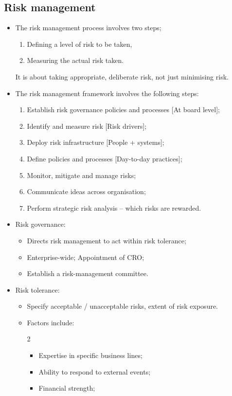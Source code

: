 \documentclass[../notes_compiled.tex]{subfiles}
\begin{document}
\subsection{Risk management}
\begin{itemize}
\item The risk management process involves two steps;
\begin{enumerate}
\item Defining a level of risk to be taken,
\item Measuring the actual risk taken.
\end{enumerate}
It is about taking appropriate, deliberate risk, not just minimising risk.
\item The risk management framework involves the following steps:
\begin{enumerate}
\item Establish risk governance policies and processes [At board level];
\item Identify and measure risk [Risk drivers];
\item Deploy risk infrastructure [People + systems];
\item Define policies and processes [Day-to-day practices];
\item Monitor, mitigate and manage risks;
\item Communicate ideas across organisation;
\item Perform strategic risk analysis -- which risks are rewarded.
\end{enumerate}
\item Risk governance:
\begin{itemize}
\item Directs risk management to act within risk tolerance;
\item Enterprise-wide; Appointment of CRO;
\item Establish a risk-management committee.
\end{itemize}
\item Risk tolerance:
\begin{itemize}
\item Specify acceptable / unacceptable risks, extent of risk exposure.
\item Factors include:
\begin{multicols}{2}
\begin{itemize}
\item Expertise in specific business lines;
\item Ability to respond to external events;
\item Financial strength;

\end{itemize}
\end{multicols}
\end{itemize}
\end{itemize}
\end{document}
